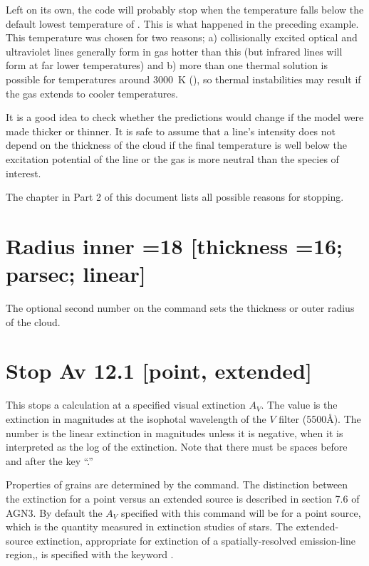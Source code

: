 Left on its own, the code will probably stop when the temperature falls
below the default lowest temperature of \TEMPSTOPDEFAULT.  This is what happened in
the preceding example.  This temperature was chosen for two reasons; a)
collisionally excited optical and ultraviolet lines generally form in gas
hotter than this (but infrared lines will form at far lower temperatures)
and b) more than one thermal solution is possible for temperatures around
3000~K (\citealp{Williams1967}), so thermal instabilities may result if the gas
extends to cooler temperatures.

It is a good idea to check whether the predictions would change if the
model were made thicker or thinner.  It is safe to assume that a line's
intensity does not depend on the thickness of the cloud if the final
temperature is well below the excitation potential of the line or the gas
is more neutral than the species of interest.

The chapter  in Part 2 of this document
lists all possible reasons for stopping.

\section{Radius inner =18 [thickness =16; parsec; linear]}

The optional
second number on the  command
sets the thickness or outer radius of the cloud.

\section{Stop Av 12.1 [point, extended]}
\label{sec:CommandStopAv}

This stops a calculation at a specified visual extinction $A_V$.
The value
is the extinction in magnitudes at the isophotal wavelength of the $V$ filter
(5500\AA ).
The number is the linear extinction in magnitudes unless it
is negative, when it is interpreted as the log of the extinction.
Note
that there must be spaces before and after the key ``.''

Properties of grains are determined by the  command.
The distinction between the extinction for a point
versus an extended source is described in
section 7.6 of AGN3.
By default the $A_V$ specified with this command will
be for a point source,
which is the quantity measured in extinction studies
of stars.
The extended-source extinction, appropriate for extinction
of a spatially-resolved emission-line region,,
is specified with the keyword .

